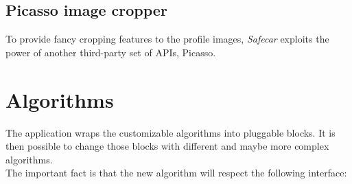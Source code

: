 \subsection{Picasso image cropper}
To provide fancy cropping features to the profile images, \textit{Safecar} exploits the power of another third-party set of APIs, Picasso.

\section{Algorithms}
The application wraps the customizable algorithms into pluggable blocks. It is then possible to change those blocks with different and maybe more complex algorithms.\\
The important fact is that the new algorithm will respect the following interface:

